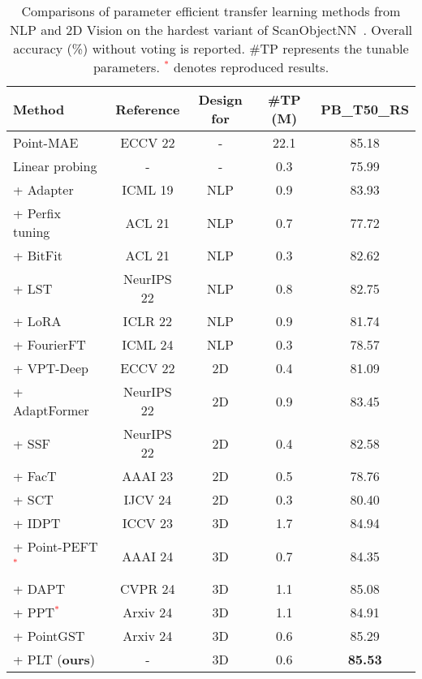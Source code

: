 \begin{table}
\scriptsize
\setlength{\tabcolsep}{1.9mm}
\centering
\caption{Comparisons of parameter efficient transfer learning methods from NLP and 2D Vision on the hardest variant of ScanObjectNN~\cite{uy2019revisiting}. Overall accuracy (\%) without voting is reported. \#TP represents the tunable parameters. \textcolor{red}{$^*$} denotes reproduced results.}
\label{tab:compare}
\begin{tabular}{ lcccc }
\toprule
 Method &Reference& Design for &\#TP (M) & PB\_T50\_RS \\
\midrule
 Point-MAE~\cite{pang2022masked}  &ECCV 22 & - & 22.1 & 85.18  \\
 Linear probing &- & - & 0.3& 75.99\\
 \midrule
  + Adapter~\cite{houlsby2019parameter}&ICML 19 & NLP & 0.9 & 83.93 \\
  + Perfix tuning~\cite{li2021prefix}& ACL 21 & NLP &0.7 & 77.72  \\
  + BitFit~\cite{zaken2022bitfit} & ACL 21 & NLP &0.3 & 82.62    \\
  + LST~\cite{sung2022lst} & NeurIPS 22 & NLP & 0.8 & 82.75\\
  + LoRA~\cite{hu2021lora} & ICLR 22 & NLP & 0.9&  81.74   \\
  + FourierFT~\cite{Gao2024Fourier} & ICML 24 & NLP &0.3 & 78.57\\
  \midrule
  + VPT-Deep~\cite{jia2022visual}&ECCV 22 & 2D &0.4 &  81.09 \\
  + AdaptFormer~\cite{chen2022adaptformer} &NeurIPS 22 & 2D &0.9  & 83.45 \\
  + SSF~\cite{lian2022scaling} & NeurIPS 22 & 2D &0.4  & 82.58\\
  + FacT~\cite{jie2023fact} & AAAI 23 & 2D & 0.5 & 78.76\\
  + SCT~\cite{zhao2024sct} & IJCV 24 & 2D & 0.3 & 80.40\\
  \midrule
  + IDPT~\cite{zha2023instance} &ICCV 23 & 3D & 1.7 &84.94\\
  + Point-PEFT\textcolor{red}{$^*$}~\cite{tang2024point} & AAAI 24 & 3D & 0.7 &84.35\\
  + DAPT~\cite{zhou2024dynamic} & CVPR 24 & 3D & 1.1 & 85.08 \\
  + PPT\textcolor{red}{$^*$}~\cite{zhang2024positional} & Arxiv 24 & 3D & 1.1 & 84.91\\
  + PointGST~\cite{liang2024parameter} & Arxiv 24 & 3D & 0.6 & 85.29\\
  \rowcolor{linecolor!40}+ PLT (\textbf{ours}) & - & 3D & 0.6 & \textbf{85.53} \\
\bottomrule
\end{tabular}
\end{table}
